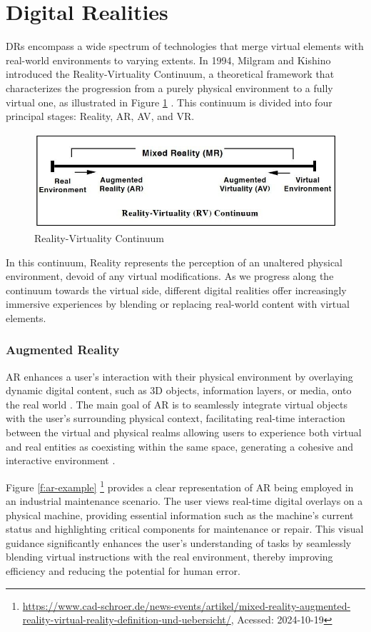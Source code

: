 \section{Digital Realities} 

\ac{DRs} encompass a wide spectrum of technologies that merge virtual elements with real-world environments to varying extents. In 1994, Milgram and Kishino introduced the Reality-Virtuality Continuum, a theoretical framework that characterizes the progression from a purely physical environment to a fully virtual one, as illustrated in Figure \ref{f:real-virtual-continuum} \cite{milgram1994}.
This continuum is divided into four principal stages: Reality, \ac{AR}, \ac{AV}, and \ac{VR}.

\begin{figure}[h]
    \centering
    \includegraphics[width=0.7\linewidth]{figs/vr-continuum.png}
    \caption{Reality-Virtuality Continuum~\cite{milgram1994}}
    \label{f:real-virtual-continuum}
\end{figure}

In this continuum, Reality represents the perception of an unaltered physical environment, devoid of any virtual modifications. As we progress along the continuum towards the virtual side, different digital realities offer increasingly immersive experiences by blending or replacing real-world content with virtual elements.

\subsubsection{Augmented Reality}
    \ac{AR} enhances a user's interaction with their physical environment by overlaying dynamic digital content, such as 3D objects, information layers, or media, onto the real world \cite{liu2022digitaltwin}. The main goal of \ac{AR} is to seamlessly integrate virtual objects with the user's surrounding physical context, facilitating real-time interaction between the virtual and physical realms allowing users to experience both virtual and real entities as coexisting within the same space, generating a cohesive and interactive environment \cite{Azuma1997}.
    
    Figure \ref{f:ar-example} \footnote{\url{https://www.cad-schroer.de/news-events/artikel/mixed-reality-augmented-reality-virtual-reality-definition-und-uebersicht/}, Acessed: 2024-10-19} provides a clear representation of \ac{AR} being employed in an industrial maintenance scenario. The user views real-time digital overlays on a physical machine, providing essential information such as the machine’s current status and highlighting critical components for maintenance or repair. This visual guidance significantly enhances the user’s understanding of tasks by seamlessly blending virtual instructions with the real environment, thereby improving efficiency and reducing the potential for human error.

